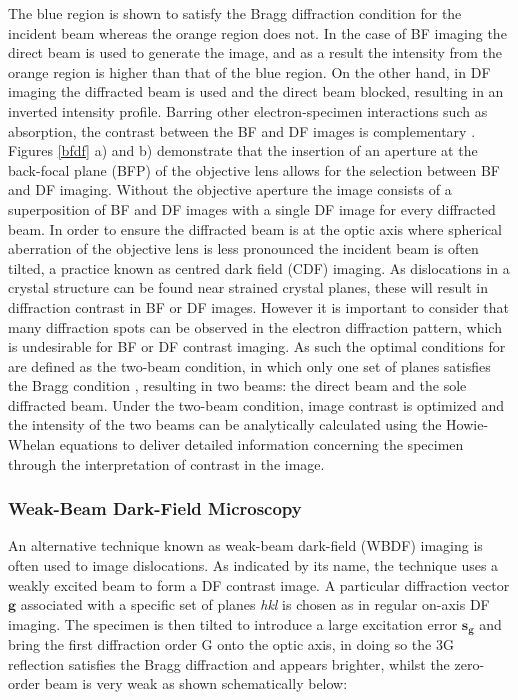 The blue region is shown to satisfy the Bragg diffraction condition for the incident beam whereas the orange region does not. In the case of BF imaging the direct beam is used to generate the image, and as a result the intensity from the orange region is higher than that of the blue region. On the other hand, in DF imaging the diffracted beam is used and the direct beam blocked, resulting in an inverted intensity profile. Barring other electron-specimen interactions such as absorption, the contrast between the BF and DF images is complementary \cite{DavidB.Williams2009}.\\
Figures \ref{bfdf} a) and b) demonstrate that the insertion of an aperture at the back-focal plane (BFP) of the objective lens allows for the selection between BF and DF imaging. Without the objective aperture the image consists of a superposition of BF and DF images with a single DF image for every diffracted beam. In order to ensure the diffracted beam is at the optic axis where spherical aberration of the objective lens is less pronounced the incident beam is often tilted, a practice known as centred dark field (CDF) imaging.
As dislocations in a crystal structure can be found near strained crystal planes, these will result in diffraction contrast in BF or DF images. However it is important to consider that many diffraction spots can be observed in the electron diffraction pattern, which is undesirable for BF or DF contrast imaging. As such the optimal conditions for are defined as the two-beam condition, in which only one set of planes satisfies the Bragg condition \cite{DavidB.Williams2009}, resulting in two beams: the direct beam and the sole diffracted beam. Under the two-beam condition, image contrast is optimized and the intensity of the two beams can be analytically calculated using the Howie-Whelan equations \cite{DavidB.Williams2009} to deliver detailed information concerning the specimen through the interpretation of contrast in the image.

\subsubsection{Weak-Beam Dark-Field Microscopy}
\label{WBDFsection}
An alternative technique known as weak-beam dark-field (WBDF)  imaging is often used to image dislocations. As indicated by its name, the technique uses a weakly excited beam to form a DF contrast image. A particular diffraction vector $\mathbf{g}$ associated with a specific set of planes \textit{hkl} is chosen as in regular on-axis DF imaging. The specimen is then tilted to introduce a large excitation error $\mathbf{s_{g}}$ and bring the first diffraction order G onto the optic axis, in doing so the 3G reflection satisfies the Bragg diffraction and appears brighter, whilst the zero-order beam is very weak as shown schematically below:

